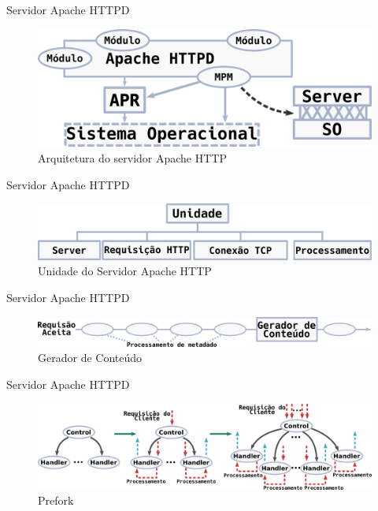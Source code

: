 \documentclass[xcolor={usenames,svgnames,dvipsnames},brazil,english,12pt,aspectratio=149]{beamer}
\begin{document}
\begin{frame}{Servidor Apache HTTPD}
	\begin{figure}[!h]
		\centering
		\includegraphics[width=.7\textwidth]{apache_arhitecture} 
		\caption{Arquitetura do servidor Apache HTTP}
		\label{fig:apache_architecture} 
	\end{figure}
\end{frame}

\begin{frame}{Servidor Apache HTTPD}
	\begin{figure}[!h]
		\centering
		\includegraphics[width=.7\textwidth]{units} 
		\caption{Unidade do Servidor Apache HTTP}
		\label{fig:units} 
	\end{figure}
\end{frame}

\begin{frame}{Servidor Apache HTTPD}
	\begin{figure}[!h]
		\centering
		\includegraphics[width=.9\textwidth]{request_phases} 
		\caption{Gerador de Conteúdo}
		\label{fig:content_generator} 
	\end{figure}
\end{frame}

\begin{frame}{Servidor Apache HTTPD}
	\begin{figure}[!h]
		\centering
		\includegraphics[width=\textwidth]{prefork} 
		\caption{Prefork}
		\label{fig:prefork} 
	\end{figure}
\end{frame}
\end{document}
